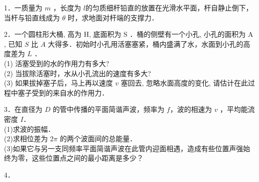 
1．一质量为 $m$ ，长度为 $l$的匀质细杆铅直的放置在光滑水平面，杆自静止倒下，当杆与铅直线成为 $\theta$ 时，求地面对杆端的支撑力．

2．一个圆柱形大桶, 高为 $\mathrm{H}$, 底面积为 $\mathrm{S}$ ．桶的侧壁有一个小孔, 小孔的面积为 $\mathrm{A}$, 已知 $S$ 比 $A$ 大得多．初始时小孔用活塞塞紧，桶内盛满了水，水面到小孔的高度差为 $L$ ．\\
(1) 活塞受到的水的作用力有多大? \\
(2) 当拔除活塞时，水从小孔流出的速度有多大? \\
(3) 如果拔掉塞子后，马上再以速度 $v$ 塞回去, 忽略水面高度的变化, 请估计在此过程中塞子受到的来自水的作用力．

3．在直径为 $D$ 的管中传播的平面简谐声波，频率为 $f$，波的相速为 $v$ ，平均能流密度 $I$．\\
(1)求波的振幅．\\
(2)求相位差为 $2\pi$ 的两个波面间的总能量．\\
(3)如果它与另一支同频率平面简谐声波在此管内迎面相遇，造成有些位置声强始终为零，这些位置点之间的最小距离是多少？

4．